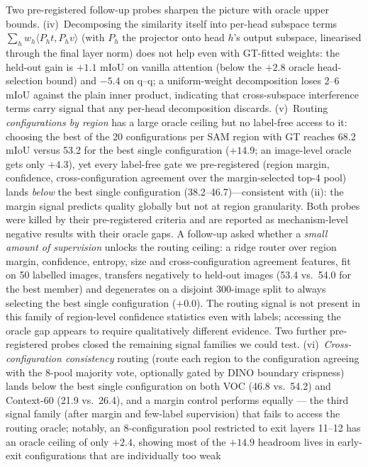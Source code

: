 \documentclass[11pt]{article}
\newcommand{\miou}{mIoU}
\begin{document}
Two pre-registered follow-up probes sharpen the picture with oracle upper bounds.
(iv)~Decomposing the similarity itself into per-head subspace terms
$\sum_h w_h \langle P_h t, P_h v\rangle$ (with $P_h$ the projector onto head $h$'s
output subspace, linearised through the final layer norm) does not help even with
GT-fitted weights: the held-out gain is $+1.1$ \miou{} on vanilla attention (below
the $+2.8$ oracle head-selection bound) and $-5.4$ on q--q; a uniform-weight
decomposition loses 2--6 \miou{} against the plain inner product, indicating that
cross-subspace interference terms carry signal that any per-head decomposition
discards. (v)~Routing \emph{configurations by region} has a large oracle ceiling
but no label-free access to it: choosing the best of the 20 configurations per SAM
region with GT reaches 68.2 \miou{} versus 53.2 for the best single configuration
($+14.9$; an image-level oracle gets only $+4.3$), yet every label-free gate we
pre-registered (region margin, confidence, cross-configuration agreement over the
margin-selected top-4 pool) lands \emph{below} the best single configuration
(38.2--46.7)---consistent with (ii): the margin signal predicts quality globally but
not at region granularity. Both probes were killed by their pre-registered criteria
and are reported as mechanism-level negative results with their oracle gaps.
A follow-up asked whether a \emph{small amount of supervision} unlocks the routing
ceiling: a ridge router over region margin, confidence, entropy, size and
cross-configuration agreement features, fit on 50 labelled images, transfers
negatively to held-out images (53.4 vs.\ 54.0 for the best member) and degenerates
on a disjoint 300-image split to always selecting the best single configuration
($+0.0$). The routing signal is not present in this family of region-level
confidence statistics even with labels; accessing the oracle gap appears to require
qualitatively different evidence.
Two further pre-registered probes closed the remaining signal families we could
test. (vi)~\emph{Cross-configuration consistency} routing (route each region to the
configuration agreeing with the 8-pool majority vote, optionally gated by DINO
boundary crispness) lands below the best single configuration on both VOC
(46.8 vs.\ 54.2) and Context-60 (21.9 vs.\ 26.4), and a margin control performs
equally --- the third signal family (after margin and few-label supervision) that
fails to access the routing oracle; notably, an 8-configuration pool restricted to
exit layers 11--12 has an oracle ceiling of only $+2.4$, showing most of the
$+14.9$ headroom lives in early-exit configurations that are individually too weak
\end{document}
